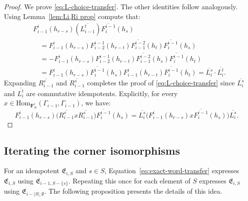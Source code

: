 \documentclass[12pt]{amsart}
\theoremstyle{definition}
\theoremstyle{remark}
\numberwithin{equation}{section}
\numberwithin{figure}{section}
\newcommand{\Hom}{\mathrm{Hom}}
\newcommand{\Li}[2]{\overline{L^{#1}_{#2}}}
\newcommand{\Ri}[2]{\overline{R^{#1}_{#2}}}
\newcommand{\Foam}{\mathbf{F}_N}
\begin{document}
\begin{proof}
We prove \eqref{eq:L-choice-transfer}. The other identities follow analogously. Using Lemma~\ref{lem:Li,Ri prop} compute that:
\begin{align*}
 &F_{i-1}^{i}(h_{r-s}) \left( \Li{t}{i-1} \right) \overline{F_i^{i-1}}(h_s)\\
 &\quad=
 F_{i-1}^{i}(h_{r-s})F_{i-2}^{i-1}(h_{r-t})
 \overline{F_{i-1}^{i-2}}(h_t)\overline{F_i^{i-1}}(h_s)\\
 &\quad=-
 F_{i-1}^{i}(h_{r-s})F_{i-2}^{i-1}(h_{r-t})
 \overline{F_{i-1}^{i-2}}(h_s)\overline{F_i^{i-1}}(h_t)\\
 &\quad=
 F_{i-1}^{i}(h_{r-s})\overline{F_i^{i-1}}(h_s)
 F_{i-1}^{i}(h_{r-t})\overline{F_i^{i-1}}(h_t)
 =\Li{s}{i} \cdot \Li{t}{i}.
\end{align*}
Expanding $\Ri{s}{i-1}$ and $\Ri{s}{i-1}$ completes the proof of \eqref{eq:L-choice-transfer} since $\Li{s}{i}$ and $\Li{t}{i}$ are commutative idempotents. Explicitly, for every
$x\in\Hom_{\Foam^\varepsilon}(\Gamma_{i-1},\Gamma_{i-1})$, we have:
\[
 F_{i-1}^{i}(h_{r-s})
 \bigl(\Ri{s}{i-1}x\Ri{s}{i-1}\bigr)
 \overline{F_i^{i-1}}(h_s)
 =
 \Li{s}{i}
 \bigl(F_{i-1}^{i}(h_{r-s})x\overline{F_i^{i-1}}(h_s)\bigr)
 \Li{s}{i}.
\]
\end{proof}

\subsection{Iterating the corner isomorphisms}\label{sec:iterated-transfer}

For an idempotent $\mathfrak{E}_{i,S}$ and $s\in S$, Equation~\eqref{eq:exact-word-transfer} expresses $\mathfrak{E}_{i,S}$ using $\mathfrak{E}_{i-1,S-\{s\}}$. Repeating this once for each element of $S$ expresses $\mathfrak{E}_{i,S}$ using $\mathfrak{E}_{i-|S|,\emptyset}$. The following proposition presents the details of this idea. 
\end{document}
